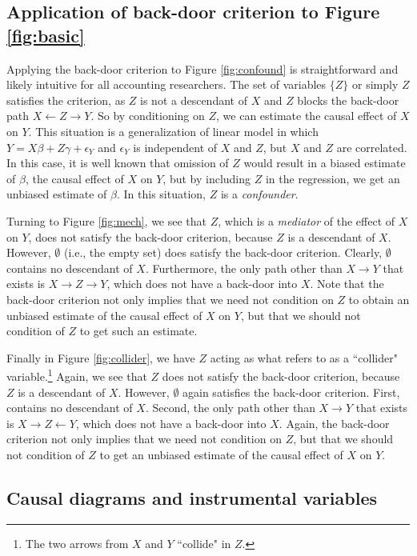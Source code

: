 \documentclass[11pt,reqno,titlepage]{amsart}
\begin{document}
 \subsection{Application of back-door criterion to Figure \ref{fig:basic}}
Applying the back-door criterion to Figure \ref{fig:confound} is straightforward and likely intuitive for all accounting researchers.
The set of variables $\{Z\}$ or simply $Z$ satisfies the criterion, as $Z$ is not a descendant of $X$ and $Z$ blocks the back-door path $X \leftarrow Z \rightarrow Y$.
So by conditioning on $Z$, we can estimate the causal effect of $X$ on $Y$.
This situation is a generalization of linear model in which $Y = X \beta + Z \gamma + \epsilon_Y$ and $\epsilon_Y$ is independent of $X$ and $Z$, but $X$ and $Z$ are correlated.
In this case, it is well known that omission of $Z$ would result in a biased estimate of $\beta$, the causal effect of $X$ on $Y$, but by including $Z$ in the regression, we get an unbiased estimate of $\beta$.
In this situation, $Z$ is a \emph{confounder}.

Turning to Figure \ref{fig:mech}, we see that $Z$, which is a \emph{mediator} of the effect of $X$ on $Y$, does not satisfy the back-door criterion, because $Z$ is a descendant of $X$.
However, $\emptyset$ (i.e., the empty set) does satisfy the back-door criterion.
Clearly, $\emptyset$ contains no descendant of $X$.
Furthermore, the only path other than $X \rightarrow Y$ that exists is $X \rightarrow Z \rightarrow Y$, which does not have a back-door into $X$.
Note that the back-door criterion not only implies that we need not condition on $Z$ to obtain an unbiased estimate of the causal effect of $X$ on $Y$, but that we should not condition of $Z$ to get such an estimate.

Finally in Figure \ref{fig:collider}, we have $Z$ acting as what \citet[p.\,17]{Pearl:2009kh} refers to as a ``collider" variable.\footnote{
The two arrows from $X$ and $Y$ ``collide" in $Z$.} 
Again, we see that $Z$ does not satisfy the back-door criterion, because $Z$ is a descendant of $X$.
However, $\emptyset$ again satisfies the back-door criterion.
First, contains no descendant of $X$.
Second, the only path other than $X \rightarrow Y$ that exists is $X \rightarrow Z \leftarrow Y$, which does not have a back-door into $X$.
Again, the back-door criterion not only implies that we need not condition on $Z$, but that we should not condition of $Z$ to get an unbiased estimate of the causal effect of $X$ on $Y$.

 \subsection{Causal diagrams and instrumental variables}
\end{document}
